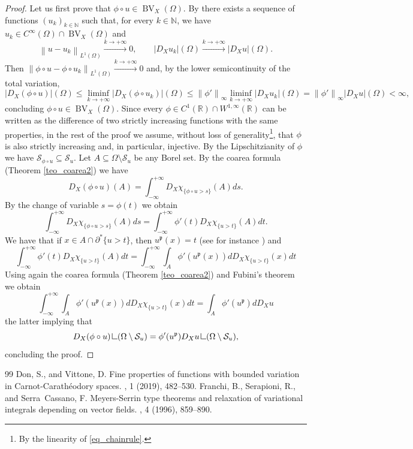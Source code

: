 \documentclass[10pt,a4paper]{amsart}
\newcommand{\N}{\mathbb{N}}
\newcommand{\R}{\mathbb{R}}
\newcommand{\bv}{\operatorname{BV}}
\newcommand{\nl}{\left\|}
\newcommand{\nr}{\right\|}
\newcommand{\p}{{\mathfrak{p}}}
\newcommand{\pp}{\partial}
\newcommand{\res} {\mathop{\hbox{\vrule height 7pt width .5pt depth 0pt \vrule height .5pt width 6pt depth 0pt}}\nolimits}
\newcommand{\s}{\mathcal{S}}
\newcommand{\se}{\subseteq}
\begin{document}
\begin{proof}
    Let us first prove that $\phi \circ u \in \bv_X(\Omega)$. By \cite[Theorem 2.2.2]{fssc} there exists a sequence of functions $(u_k)_{k \in \N}$ such that, for every $k \in \N$, we have $u_k \in C^\infty(\Omega) \cap \bv_X(\Omega)$ and
    \[
    \nl u-u_k \nr_{L^1(\Omega)} \xrightarrow{k \to +\infty}0, \qquad |D_Xu_k|(\Omega) \xrightarrow{k \to +\infty}|D_Xu|(\Omega).
    \]
    Then $\nl \phi \circ u-\phi \circ u_k \nr_{L^1(\Omega)} \xrightarrow{k \to +\infty}0$ and, by the lower semicontinuity of the total variation, 
    \[
    |D_X(\phi \circ u)|(\Omega) \leq \liminf_{k \to +\infty} |D_X(\phi \circ u_k)|(\Omega) \leq \nl \phi' \nr_{\infty}\liminf_{k \to +\infty}|D_Xu_k|(\Omega)=\nl \phi' \nr_{\infty}|D_Xu|(\Omega)<\infty,
    \]
concluding $\phi \circ u \in \bv_X(\Omega)$. Since every $\phi \in C^1(\R) \cap W^{1,\infty}(\R)$ can be written as the difference of two strictly increasing functions with the same properties, in the rest of the proof we assume, without loss of generality\footnote{By the linearity of \eqref{eq_chainrule}.}, that $\phi$ is also strictly increasing and, in particular, injective. By the Lipschitzianity of $\phi$ we have $\s_{\phi \circ u} \se \s_u$. Let $A \se \Omega \setminus \s_u$ be any Borel set. By the coarea formula (Theorem \ref{teo_coarea2}) we have
\[
D_X(\phi \circ u)(A)=\int_{-\infty}^{+\infty} D_X\chi_{  \{ \phi \circ u >s  \}  } (A)ds.
\]
By the change of variable $s=\phi(t)$ we obtain
\[
\int_{-\infty}^{+\infty} D_X\chi_{\{\phi \circ u>s \}} (A)ds=\int_{-\infty}^{+\infty} \phi'(t)D_X\chi_{\{u>t \}} (A)dt.
\]
We have that if $x \in A \cap \pp^* \{u>t \} $, then $u^\p(x)=t$ (see for instance \cite[Proposition 2.22]{dv}) and 
\[
\int_{-\infty}^{+\infty} \phi'(t)D_X\chi_{\{u>t \}} (A)dt=\int_{-\infty}^{+\infty}\int_A\phi'(u^\p(x))dD_X\chi_{\{u>t \}}(x)dt
\]
Using again the coarea formula (Theorem \ref{teo_coarea2}) and Fubini's theorem we obtain
\[
\int_{-\infty}^{+\infty}\int_A\phi'(u^\p(x))dD_X\chi_{\{u>t \}}(x)dt=\int_A \phi'(u^\p)dD_Xu
\]
the latter implying that 
\[
D_X(\phi \circ u) \res (\Omega \setminus \s_u)=\phi'(u^\p)D_Xu\res (\Omega \setminus \s_u),   
\]
concluding the proof.

\end{proof}

\begin{thebibliography}{99}
 {\sc Don, S., and Vittone, D.} \newblock Fine properties of functions with bounded variation in {C}arnot-{C}arath\'{e}odory spaces. , 1 (2019), 482--530.
 {\sc Franchi, B., Serapioni, R., and Serra~Cassano, F.} \newblock Meyers-{S}errin type theorems and relaxation of variational integrals depending on vector fields. , 4 (1996), 859--890.
\end{thebibliography}
\end{document}

